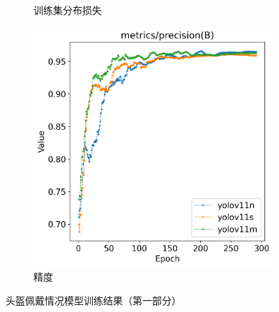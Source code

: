 \begin{figure}[H]
\begin{subfigure}[t]{0.43\textwidth}
        \caption{训练集分布损失}
        \label{fig:helmet_train_dfl_loss}
    \end{subfigure}
    \begin{subfigure}[t]{0.43\textwidth}
        \centering
        \includegraphics[width=\textwidth]{figs/chap04/helmet_result/helmet_metrics_precision(B).png}
        \caption{精度}
        \label{fig:helmet_metrics_precision}
    \end{subfigure}
    \caption{头盔佩戴情况模型训练结果（第一部分）}
    \label{fig:helmetResult_part1}
\end{figure}

\newpage %

